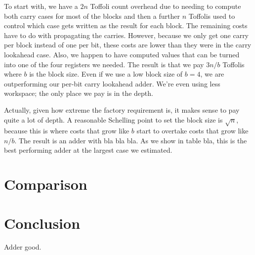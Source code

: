 \documentclass[onecolumn,unpublished]{quantumarticle}
\theoremstyle{definition}
\theoremstyle{definition}
\theoremstyle{definition}
\begin{document}
To start with, we have a $2n$ Toffoli count overhead due to needing to compute both carry cases for most of the blocks and then a further $n$ Toffolis used to control which case gets written as the result for each block.
The remaining costs have to do with propagating the carries.
However, because we only get one carry per block instead of one per bit, these costs are lower than they were in the carry lookahead case.
Also, we happen to have computed values that can be turned into one of the four registers we needed.
The result is that we pay $3n/b$ Toffolis where $b$ is the block size.
Even if we use a low block size of $b = 4$, we are outperforming our per-bit carry lookahead adder.
We're even using less workspace; the only place we pay is in the depth.

Actually, given how extreme the factory requirement is, it makes sense to pay quite a lot of depth.
A reasonable Schelling point to set the block size is $\sqrt{n}$, because this is where costs that grow like $b$ start to overtake costs that grow like $n/b$.
The result is an adder with bla bla bla.
As we show in table bla, this is the best performing adder at the largest case we estimated.

\section{Comparison}


\section{Conclusion}

Adder good.



\end{document}
